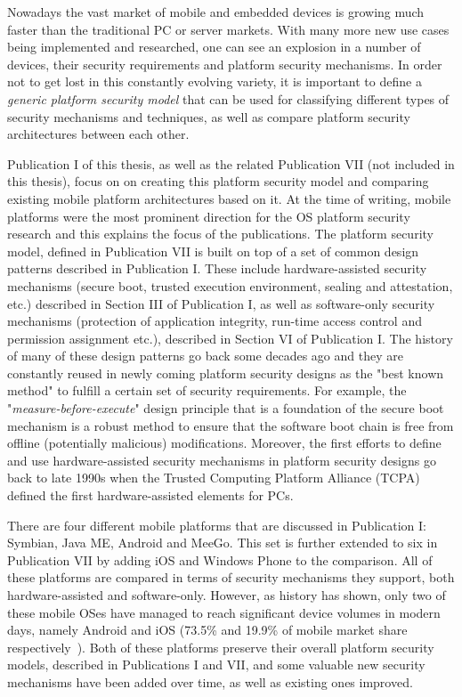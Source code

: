 \begin{quoting}
\end{quoting}

Nowadays the vast market of mobile and embedded devices is growing much faster than the traditional PC or server markets. With many more new use cases being implemented and researched, one can see an explosion in a number of devices, their security requirements and platform security mechanisms. In order not to get lost in this constantly evolving variety, it is important to define a \textit{generic platform security model} that can be used for classifying different types of security mechanisms and techniques, as well as compare platform security architectures between each other. 

Publication I of this thesis, as well as the related Publication VII (not included in this thesis), focus on on creating this platform security model and comparing existing mobile platform architectures based on it. At the time of writing, mobile platforms were the most prominent direction for the OS platform security research and this explains the focus of the publications. The platform security model, defined in Publication VII is built on top of a set of common design patterns described in Publication I. These include hardware-assisted security mechanisms (secure boot, trusted execution environment, sealing and attestation, etc.) described in Section III of Publication I, as well as software-only security mechanisms (protection of application integrity, run-time access control and permission assignment etc.), described in Section VI of Publication I. The history of many of these design patterns go back some decades ago and they are constantly reused in newly coming platform security designs as the "best known method" to fulfill a certain set of security requirements. For example, the "\textit{measure-before-execute}" design principle that is a foundation of the secure boot mechanism is a robust method to ensure that the software boot chain is free from offline (potentially malicious) modifications. Moreover, the first efforts to define and use hardware-assisted security mechanisms in platform security designs go back to late 1990s when the Trusted Computing Platform Alliance (TCPA)~\cite{pearson2002} defined the first hardware-assisted elements for PCs.

There are four different mobile platforms that are discussed in Publication I: Symbian, Java ME, Android and MeeGo. This set is further extended to six in Publication VII by adding iOS and Windows Phone to the comparison. All of these platforms are compared in terms of security mechanisms they support, both hardware-assisted and software-only. However, as history has shown, only two of these mobile OSes have managed to reach significant device volumes in modern days, namely Android and iOS (73.5\% and 19.9\% of mobile market share respectively~\cite{osshare}). Both of these platforms preserve their overall platform security models, described in Publications I and VII, and some valuable new security mechanisms have been added over time, as well as existing ones improved. 

